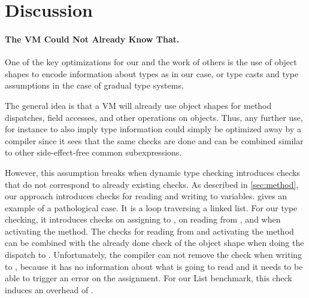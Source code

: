 
\section{Discussion}
\label{sec:discussion}

\paragraph{The VM Could Not Already Know That.}
\label{sec:disc-pathological-case}



One of the key optimizations for our
and the work of others\citep{Richards2017,Bauman2017}
is the use of object shapes
to encode information about types as in our case,
or type casts and type assumptions in the case of gradual type systems.

The general idea is that a VM will already use object shapes
for method dispatches, field accesses, and other operations on objects.
Thus, any further use, for instance to also imply type information could simply
be optimized away by a compiler since it sees that the same checks are
done and can be combined similar to 
other side-effect-free common subexpressions.

However, this assumption breaks when dynamic type checking
introduces checks that do not correspond to already existing checks.
As described in \cref{sec:method},
our approach introduces checks for reading and writing to variables.
 gives an example of a pathological case.
It is a loop traversing a linked list.
For our type checking,
it introduces checks on assigning to , on reading from ,
and when activating the  method.
The checks for reading from  and activating the method can be
combined with the already done check of the object shape when doing the
dispatch to .
%
Unfortunately, the compiler can not remove the check
when writing to , because it has no information about
what  is going to read and it needs to be able to trigger an error
on the assignment.
For our List benchmark, this check induces an overhead of \OverheadListP.


